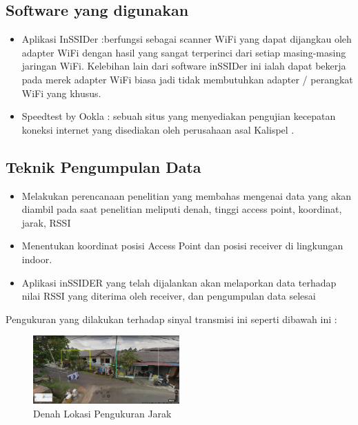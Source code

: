 \documentclass[conference]{IEEEtran}
\begin{document}
\subsection{Software yang digunakan}

\begin{itemize}
    \item Aplikasi InSSIDer :berfungsi sebagai scanner WiFi yang dapat dijangkau oleh adapter WiFi dengan hasil yang sangat terperinci dari setiap masing-masing jaringan WiFi. Kelebihan lain dari software inSSIDer ini ialah dapat bekerja pada merek adapter WiFi biasa jadi tidak membutuhkan adapter / perangkat WiFi yang khusus.
    \item Speedtest by Ookla : sebuah situs yang menyediakan pengujian kecepatan koneksi internet yang disediakan oleh perusahaan asal Kalispel .
\end{itemize}

\subsection{Teknik Pengumpulan Data}

\begin{itemize}
\item Melakukan perencanaan penelitian yang membahas mengenai data yang akan diambil
pada saat penelitian meliputi denah, tinggi
access point, koordinat, jarak, RSSI 

\item Menentukan koordinat posisi Access Point
dan posisi receiver di lingkungan indoor.

\item Aplikasi inSSIDER yang telah dijalankan
akan melaporkan data terhadap nilai RSSI
yang diterima oleh receiver, dan
pengumpulan data selesai
\end{itemize}

Pengukuran yang dilakukan terhadap sinyal transmisi ini seperti dibawah ini :

\begin{figure}[h]
    \centering
    \includegraphics[width=0.5\textwidth]{gambar-lokasi.png}
    \caption{Denah Lokasi Pengukuran Jarak}
\end{figure}
\end{document}
